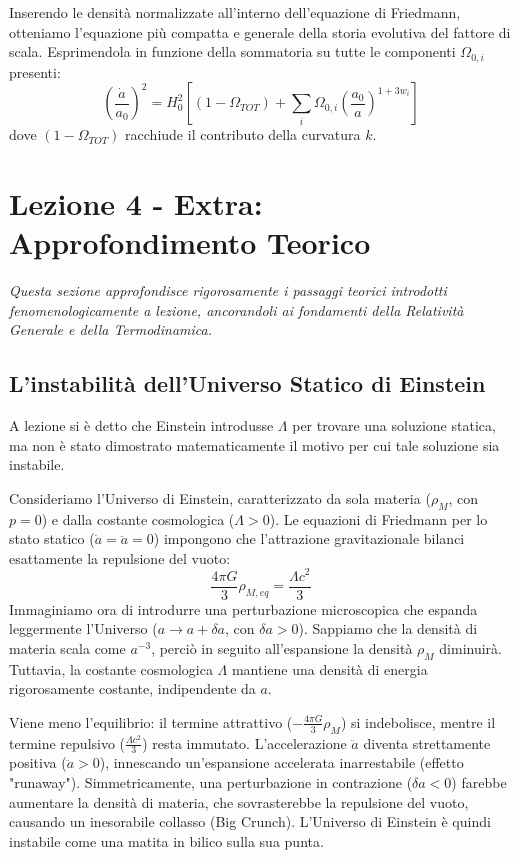 \documentclass[11pt,a4paper]{report}
\begin{document}
Inserendo le densità normalizzate all'interno dell'equazione di Friedmann, otteniamo l'equazione più compatta e generale della storia evolutiva del fattore di scala. Esprimendola in funzione della sommatoria su tutte le componenti $\Omega_{0,i}$ presenti:
\begin{equation}
\left(\frac{\dot{a}}{a_0}\right)^2 = H_0^2 \left[ (1 - \Omega_{TOT}) + \sum_i \Omega_{0,i} \left( \frac{a_0}{a} \right)^{1+3w_i} \right]
\end{equation}
dove $(1 - \Omega_{TOT})$ racchiude il contributo della curvatura $k$. 

\newpage
\section{Lezione 4 - Extra: Approfondimento Teorico}

\textit{Questa sezione approfondisce rigorosamente i passaggi teorici introdotti fenomenologicamente a lezione, ancorandoli ai fondamenti della Relatività Generale e della Termodinamica.}

\subsection{L'instabilità dell'Universo Statico di Einstein}
A lezione si è detto che Einstein introdusse $\Lambda$ per trovare una soluzione statica, ma non è stato dimostrato matematicamente il motivo per cui tale soluzione sia instabile.

Consideriamo l'Universo di Einstein, caratterizzato da sola materia ($\rho_M$, con $p=0$) e dalla costante cosmologica ($\Lambda > 0$). Le equazioni di Friedmann per lo stato statico ($\dot{a}=\ddot{a}=0$) impongono che l'attrazione gravitazionale bilanci esattamente la repulsione del vuoto:
\begin{equation}
\frac{4\pi G}{3}\rho_{M, eq} = \frac{\Lambda c^2}{3}
\end{equation}
Immaginiamo ora di introdurre una perturbazione microscopica che espanda leggermente l'Universo ($a \to a + \delta a$, con $\delta a > 0$). Sappiamo che la densità di materia scala come $a^{-3}$, perciò in seguito all'espansione la densità $\rho_M$ diminuirà. Tuttavia, la costante cosmologica $\Lambda$ mantiene una densità di energia rigorosamente costante, indipendente da $a$. 

Viene meno l'equilibrio: il termine attrattivo ($-\frac{4\pi G}{3}\rho_M$) si indebolisce, mentre il termine repulsivo ($\frac{\Lambda c^2}{3}$) resta immutato. L'accelerazione $\ddot{a}$ diventa strettamente positiva ($\ddot{a} > 0$), innescando un'espansione accelerata inarrestabile (effetto "runaway"). 
Simmetricamente, una perturbazione in contrazione ($\delta a < 0$) farebbe aumentare la densità di materia, che sovrasterebbe la repulsione del vuoto, causando un inesorabile collasso (Big Crunch). L'Universo di Einstein è quindi instabile come una matita in bilico sulla sua punta.
\end{document}
